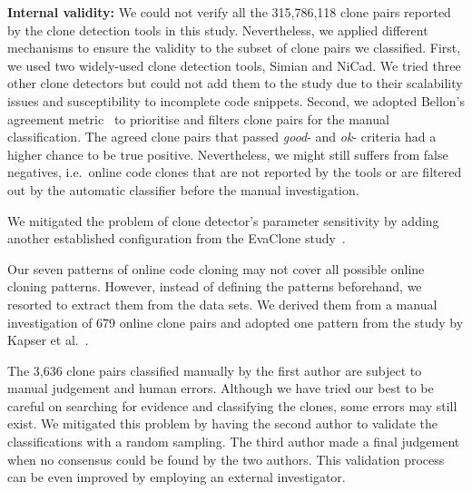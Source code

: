 \documentclass[sigconf,review, anonymous]{acmart}
\begin{document}
\textbf{Internal validity:} 
%
We could not verify all the 315,786,118 clone pairs reported by the
clone detection tools in this study.  Nevertheless, we applied
different mechanisms to ensure the validity to the subset of clone
pairs we classified.  First, we used two widely-used
clone detection tools, Simian and NiCad.  We tried three other
clone detectors but could not add them to the study due to their
scalability issues and susceptibility to incomplete code snippets.
Second, we adopted Bellon's agreement metric~\cite{Bellon2007}
to prioritise and filters clone pairs for the manual
classification. The agreed clone pairs that passed \textit{good}- and
\textit{ok}- criteria had a higher chance to be true positive. 
Nevertheless, we might still suffers from false negatives, i.e.~online 
code clones that are not reported by the tools or are filtered 
out by the automatic classifier before the manual investigation.

We mitigated the problem of clone
detector's parameter sensitivity by adding another established
configuration from the EvaClone study~\cite{Wang2013}. 


Our seven patterns of online code cloning may not cover all possible
online cloning patterns. However, instead of defining the patterns
beforehand, we resorted to extract them from the data sets. We derived
them from a manual investigation of 679 online clone pairs and adopted
one pattern from the study by Kapser et al.~\cite{Kapser2003}.

The 3,636 clone pairs classified manually by the first author are
subject to manual judgement and human errors.  Although we have tried
our best to be careful on searching for evidence and classifying the
clones, some errors may still exist. We mitigated this problem by
having the second author to validate the classifications with a random
sampling. 
The third author made a final judgement when no consensus
could be found by the two authors. This validation process
can be even improved by employing an external investigator. 
\end{document}
